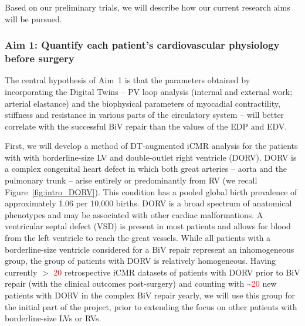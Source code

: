 Based on our preliminary trials, we will describe how our current research aims will be pursued. 


\subsubsection{Aim 1: Quantify each patient's cardiovascular physiology before surgery}

The central hypothesis of Aim~1 is that the parameters obtained by incorporating the Digital Twins -- PV loop analysis (internal and external work; arterial elastance) and the biophysical parameters of myocadial contractility, stiffness and resistance in various parts of the circulatory system -- will better correlate with the successful BiV repair than the values of the EDP and EDV.  

First, we will develop a method of DT-augmented iCMR analysis for the patients with  with borderline-size LV and double-outlet right ventricle (DORV).  DORV is a complex congenital heart defect in which both
great arteries -- aorta and the pulmonary trunk -- arise entirely or predominantly from RV (we recall Figure~\ref{fig:intro_DORV}). This condition has a pooled global birth prevalence of approximately
1.06 per 10,000 births\cite{liu2019_prevalenceOfCHD}. 
DORV is a broad spectrum of anatomical phenotypes and may be
associated with other cardiac malformations\cite{bell2023_DORV}. 
A ventricular septal defect (VSD) is present
in most patients and allows for blood from the left ventricle to reach the great vessels. 
While all patients with a borderline-size ventricle considered for a BiV repair represent an inhomogeneous group, the group of patients with DORV is relatively homogeneous. Having currently $>$ \textcolor{red}{20} retrospective iCMR datasets of patients with DORV prior to BiV repair (with the clinical outcomes post-surgery) and counting with \textasciitilde{}\textcolor{red}{20}  new patients with DORV in the complex BiV repair yearly, we will use this group for the initial part of the project, prior to extending the focus on other patients with borderline-size LVs or RVs. 


